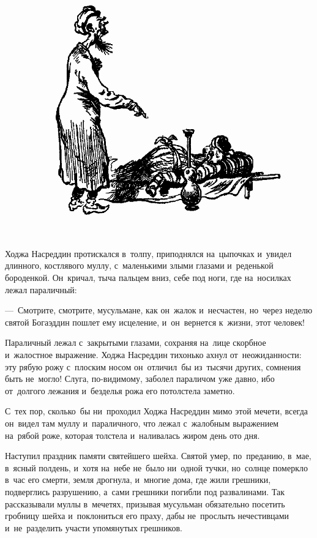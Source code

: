 \documentclass[12pt,a4paper]{book}
\begin{document}
\begin{figure}[h]
\centering
\includegraphics[width=\textwidth]{10.png}
\end{figure}

Ходжа Насреддин протискался в~толпу, приподнялся на~цыпочках и~увидел длинного, костлявого муллу, с~маленькими злыми глазами и~реденькой бороденкой. Он~кричал, тыча пальцем вниз, себе под ноги, где на~носилках лежал параличный:

—~Смотрите, смотрите, мусульмане, как он~жалок и~несчастен, но~через неделю святой Богаэддин пошлет ему исцеление, и~он~вернется к~жизни, этот человек!

Параличный лежал с~закрытыми глазами, сохраняя на~лице скорбное и~жалостное выражение. Ходжа Насреддин тихонько ахнул от~неожиданности: эту рябую рожу с~плоским носом он~отличил~бы из~тысячи других, сомнения быть не~могло! Слуга, по-видимому, заболел параличом уже давно, ибо от~долгого лежания и~безделья рожа его потолстела заметно.

С~тех пор, сколько~бы ни~проходил Ходжа Насреддин мимо этой мечети, всегда он~видел там муллу и~параличного, что лежал с~жалобным выражением на~рябой роже, которая толстела и~наливалась жиром день ото дня.

Наступил праздник памяти святейшего шейха. Святой умер, по~преданию, в~мае, в~ясный полдень, и~хотя на~небе не~было ни~одной тучки, но~солнце померкло в~час его смерти, земля дрогнула, и~многие дома, где жили грешники, подверглись разрушению, а~сами грешники погибли под развалинами. Так рассказывали муллы в~мечетях, призывая мусульман обязательно посетить гробницу шейха и~поклониться его праху, дабы не~прослыть нечестивцами и~не~разделить участи упомянутых грешников.
\end{document}
